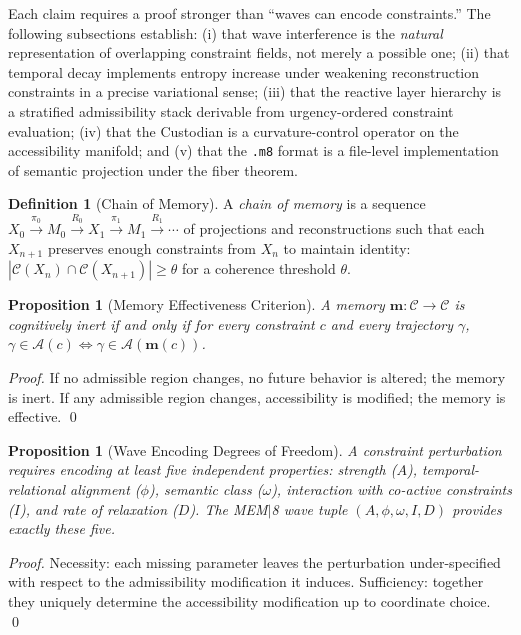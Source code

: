\documentclass[12pt, a4paper, twoside]{article}
\theoremstyle{plain}
\newtheorem{proposition}[theorem]{Proposition}
\theoremstyle{definition}
\newtheorem{definition}[theorem]{Definition}
\theoremstyle{remark}
\newcommand{\Acc}{\mathcal{A}}
\newcommand{\Proj}{\pi}
\begin{document}
Each claim requires a proof stronger than ``waves can encode constraints.''
The following subsections establish: (i) that wave interference is the
\emph{natural} representation of overlapping constraint fields, not merely a
possible one; (ii) that temporal decay implements entropy increase under
weakening reconstruction constraints in a precise variational sense; (iii) that
the reactive layer hierarchy is a stratified admissibility stack derivable from
urgency-ordered constraint evaluation; (iv) that the Custodian is a
curvature-control operator on the accessibility manifold; and (v) that the
\texttt{.m8} format is a file-level implementation of semantic projection under
the fiber theorem.


\begin{definition}[Chain of Memory]
\label{def:chain_of_memory}
A \emph{chain of memory} is a sequence $X_0 \xrightarrow{\Proj_0} M_0
\xrightarrow{R_0} X_1 \xrightarrow{\Proj_1} M_1 \xrightarrow{R_1} \cdots$
of projections and reconstructions such that each $X_{n+1}$ preserves enough
constraints from $X_n$ to maintain identity:
$|\mathcal{C}(X_n) \cap \mathcal{C}(X_{n+1})| \geq \theta$
for a coherence threshold $\theta$.
\end{definition}

\begin{proposition}[Memory Effectiveness Criterion]
\label{prop:mem_effective}
A memory $\mathbf{m}: \mathcal{C} \to \mathcal{C}$ is cognitively inert if
and only if for every constraint $c$ and every trajectory $\gamma$,
$\gamma \in \Acc(c) \iff \gamma \in \Acc(\mathbf{m}(c))$.
\end{proposition}

\begin{proof}
If no admissible region changes, no future behavior is altered; the memory is
inert. If any admissible region changes, accessibility is modified; the memory
is effective. \qed
\end{proof}

\begin{proposition}[Wave Encoding Degrees of Freedom]
\label{prop:wave_dof}
A constraint perturbation requires encoding at least five independent
properties: strength ($A$), temporal-relational alignment ($\phi$), semantic
class ($\omega$), interaction with co-active constraints ($I$), and rate of
relaxation ($D$). The MEM$|$8 wave tuple $(A, \phi, \omega, I, D)$ provides
exactly these five.
\end{proposition}

\begin{proof}
Necessity: each missing parameter leaves the perturbation under-specified
with respect to the admissibility modification it induces. Sufficiency:
together they uniquely determine the accessibility modification up to coordinate
choice. \qed
\end{proof}
\end{document}
